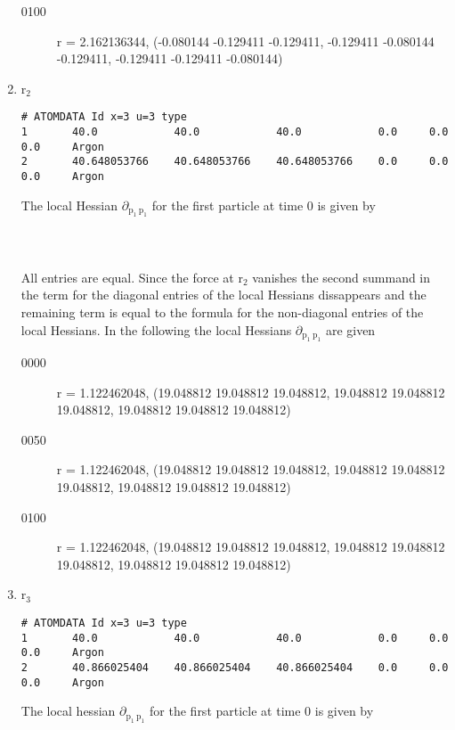 \documentclass[11pt]{article}
\begin{document}
\begin{enumerate}
\begin{description}
\item[{0100}] r = 2.162136344, (-0.080144 -0.129411 -0.129411, -0.129411 -0.080144 -0.129411, -0.129411 -0.129411 -0.080144)
\end{description}
\item r$_{\text{2}}$
\label{sec-1-4-4-3}
\begin{verbatim}
# ATOMDATA Id x=3 u=3 type
1       40.0            40.0            40.0            0.0     0.0     0.0     Argon
2       40.648053766    40.648053766    40.648053766    0.0     0.0     0.0     Argon
\end{verbatim}
The local Hessian $\partial$$_{\text{p}_{\text{1}} \ \text{p}_{\text{1}}}$ for the first particle at time 0 is given by\\
[19.048812 19.048812 19.048812]\\
[19.048812 19.048812 19.048812]\\
[19.048812 19.048812 19.048812]\\
All entries are equal. Since the force at r$_{\text{2}}$ vanishes the second summand in the term for the diagonal entries of the
local Hessians dissappears and the remaining term is equal to the formula for the non-diagonal entries of the local Hessians.
In the following the local Hessians $\partial$$_{\text{p}_{\text{1}} \ \text{p}_{\text{1}}}$ are given
\begin{description}
\item[{0000}] r = 1.122462048, (19.048812 19.048812 19.048812, 19.048812 19.048812 19.048812, 19.048812 19.048812 19.048812)
\item[{0050}] r = 1.122462048, (19.048812 19.048812 19.048812, 19.048812 19.048812 19.048812, 19.048812 19.048812 19.048812)
\item[{0100}] r = 1.122462048, (19.048812 19.048812 19.048812, 19.048812 19.048812 19.048812, 19.048812 19.048812 19.048812)
\end{description}
\item r$_{\text{3}}$
\label{sec-1-4-4-4}
\begin{verbatim}
# ATOMDATA Id x=3 u=3 type
1       40.0            40.0            40.0            0.0     0.0     0.0     Argon
2       40.866025404    40.866025404    40.866025404    0.0     0.0     0.0     Argon
\end{verbatim}
The local hessian $\partial$$_{\text{p}_{\text{1}} \ \text{p}_{\text{1}}}$ for the first particle at time 0 is given by\\
[-0.957852 -1.729871 -1.729871]\\
[-1.729871 -0.957852 -1.729871]\\
$$
\end{enumerate}
\end{document}
